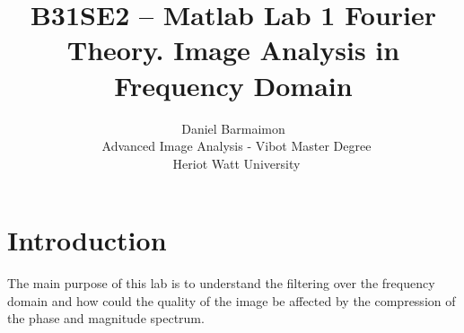 \documentclass[a4paper, 10pt, conference] {article}
\begin{document}
\date{}
\title{\LARGE \bf
B31SE2 – Matlab Lab 1
Fourier Theory. Image Analysis in Frequency Domain
}

\author{ \parbox{5 in}{\centering Daniel Barmaimon \\
         \ Advanced Image Analysis - Vibot Master Degree\\
         \ Heriot Watt University\\         
}}

\maketitle


\section{Introduction}
The main purpose of this lab is to understand the filtering over the frequency domain and how could the quality of the image be affected by the compression of the phase and magnitude spectrum.
%
%
\end{document}
